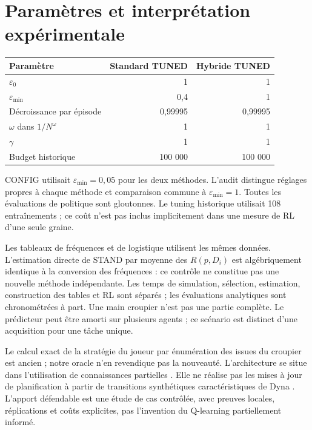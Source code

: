 \documentclass[11pt,a4paper]{article}
\theoremstyle{remark}\newtheorem*{remarque}{Remarque}
\newcommand{\1}{\mathbf 1}
\begin{document}
\section{Paramètres et interprétation expérimentale}
\begin{center}\begin{tabular}{lrr}\toprule
Paramètre & Standard TUNED & Hybride TUNED\\\midrule
$\varepsilon_0$ & 1 & 1\\
$\varepsilon_{\min}$ & 0,4 & 1\\
Décroissance par épisode & 0,99995 & 0,99995\\
$\omega$ dans $1/N^\omega$ & 1 & 1\\
$\gamma$ & 1 & 1\\
Budget historique & 100 000 & 100 000\\\bottomrule\end{tabular}\end{center}
CONFIG utilisait $\varepsilon_{\min}=0{,}05$ pour les deux méthodes.
L'audit distingue réglages propres à chaque méthode et comparaison commune à
$\varepsilon_{\min}=1$. Toutes les évaluations de politique sont gloutonnes.
Le tuning historique utilisait 108 entraînements ; ce coût n'est pas inclus
implicitement dans une mesure de RL d'une seule graine.

Les tableaux de fréquences et de logistique utilisent les mêmes données.
L'estimation directe de STAND par moyenne des $R(p,D_i)$ est algébriquement
identique à la conversion des fréquences : ce contrôle ne constitue pas une
nouvelle méthode indépendante. Les temps de simulation, sélection, estimation,
construction des tables et RL sont séparés ; les évaluations analytiques sont
chronométrées à part. Une main croupier n'est pas une partie complète.
Le prédicteur peut être amorti sur plusieurs agents ; ce scénario est distinct
d'une acquisition pour une tâche unique.

Le calcul exact de la stratégie du joueur par énumération des issues du croupier
est ancien \cite{baldwin} ; notre oracle n'en revendique pas la nouveauté.
L'architecture se situe dans l'utilisation de connaissances partielles
\cite{shelton}. Elle ne réalise pas les mises à jour de planification à partir
de transitions synthétiques caractéristiques de Dyna \cite{dyna}.
L'apport défendable est une étude de cas contrôlée, avec preuves locales,
réplications et coûts explicites, pas l'invention du Q-learning partiellement informé.
\end{document}
